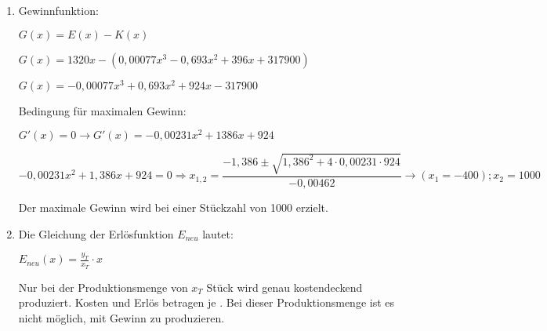 \begin{langesbeispiel}
{\begin{enumerate}
Der Stückpreis muss erhöht werden. Die Nullstellen liegen weiter auseinander, das heißt, der Gewinnbereich wird größer.

\item Gewinnfunktion:

$G(x)=E(x)-K(x)$

$G(x)=1320x-(0,00077x^3-0,693x^2+396x+317900)$

$G(x)=-0,00077x^3+0,693x^2+924x-317900$

Bedingung für maximalen Gewinn:

$G'(x)=0 \rightarrow G'(x)=-0,00231x^2+1386x+924$

$-0,00231x^2+1,386x+924=0 \Rightarrow x_{1,2}=\dfrac{-1,386\pm\sqrt{1,386^2+4\cdot 0,00231\cdot 924}}{-0,00462} \rightarrow (x_1=-400); x_2=1000$

Der maximale Gewinn wird bei einer Stückzahl von 1000 erzielt.

\item Die Gleichung der Erlösfunktion $E_{neu}$ lautet:

$E_{neu}(x)=\frac{y_T}{x_T}\cdot x$

Nur bei der Produktionsmenge von $x_T$ Stück wird genau kostendeckend produziert. Kosten und Erlös betragen je . Bei dieser Produktionsmenge ist es nicht möglich, mit Gewinn zu produzieren.
\end{enumerate}}
\end{langesbeispiel}